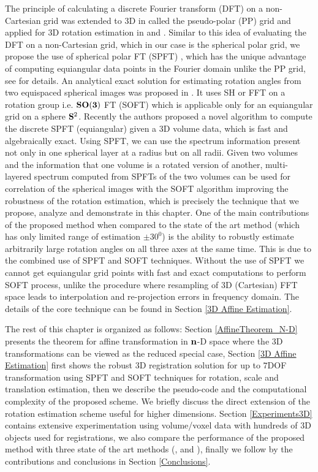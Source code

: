 \documentclass{UCF_ETD}
\begin{document}
The principle of calculating a discrete Fourier transform (DFT) on a non-Cartesian grid was extended to $3$D in \cite{Averbuch2003} called the pseudo-polar (PP) grid and applied for $3$D rotation estimation in \cite{KellerConf05} and \cite{KellerTSP2006}. Similar to this idea of evaluating the DFT on a non-Cartesian grid, which in our case is the spherical polar grid, we propose the use of spherical polar FT (SPFT) \cite{Alam2015}, which has the unique advantage of computing equiangular data points in the Fourier domain unlike the PP grid, see \cite{Alam2015} for details.  An analytical exact solution for estimating rotation angles from two equispaced spherical images was proposed in \cite{Kostelec2008}. It uses SH or FFT on a rotation group i.e. ${\bf SO(3)}$ FT (SOFT) which is applicable only for an equiangular grid on a sphere ${\bf S}^2$. Recently the authors proposed a novel algorithm to compute the discrete SPFT (equiangular) given a $3$D volume data, which is fast and algebraically exact. Using SPFT, we can use the spectrum information present not only in one spherical layer at a radius but on all radii. Given two volumes and the information that one volume is a rotated version of another, multi-layered spectrum computed from SPFTs of the two volumes can be used for correlation of the spherical images with the SOFT algorithm improving the robustness of the rotation estimation, which is precisely the technique that we propose, analyze and demonstrate in this chapter. One of the main contributions of the proposed method when compared to the state of the art method \cite{Bulow2013} (which has only limited range of estimation $\pm 30^0$) is the ability to robustly estimate arbitrarily large rotation angles on all three axes at the same time. This is due to the combined use of SPFT and SOFT techniques. Without the use of SPFT we cannot get equiangular grid points with fast and exact computations to perform SOFT process, unlike the procedure where resampling of 3D (Cartesian) FFT space leads to interpolation and re-projection errors in frequency domain. The details of the core technique can be found in Section \ref{3D Affine Estimation}.

The rest of this chapter is organized as follows: Section \ref{AffineTheorem_N-D} presents the theorem for affine transformation in ${\bf n}$-D space where the $3$D transformations can be viewed as the reduced special case, Section \ref{3D Affine Estimation} first shows the robust $3$D registration solution for up to $7$DOF transformation using SPFT and SOFT techniques for rotation, scale and translation estimation, then we describe the pseudo-code and the computational complexity of the proposed scheme. We briefly discuss the direct extension of the rotation estimation scheme useful for higher dimensions. Section \ref{Experiments3D} contains extensive experimentation using volume/voxel data with hundreds of $3$D objects used for registrations, we also compare the performance of the proposed method with three state of the art methods (\cite{Salah2013},\cite{Bulow2013} and \cite{Jiaolong2016}), finally we follow by the contributions and conclusions in Section \ref{Conclusions}.
\end{document}
